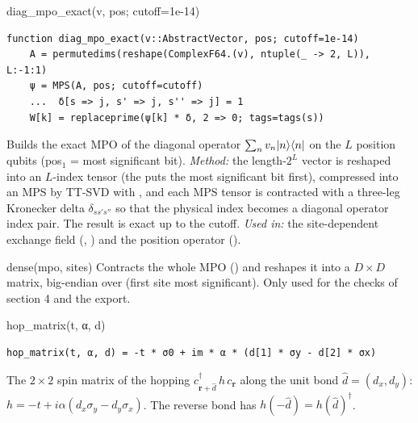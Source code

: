 \begin{function}{diag\_mpo\_exact(v, pos; cutoff=1e-14)}
\begin{Verbatim}
function diag_mpo_exact(v::AbstractVector, pos; cutoff=1e-14)
    A = permutedims(reshape(ComplexF64.(v), ntuple(_ -> 2, L)), L:-1:1)
    ψ = MPS(A, pos; cutoff=cutoff)
    ...  δ[s => j, s' => j, s'' => j] = 1
    W[k] = replaceprime(ψ[k] * δ, 2 => 0; tags=tags(s))
\end{Verbatim}
Builds the exact MPO of the diagonal operator $\sum_n v_n|n\rangle\langle n|$ on the $L$ position qubits (pos$_1$ = most significant bit).
\emph{Method:} the length-$2^L$ vector is reshaped into an $L$-index tensor (the  puts the most significant bit first),
compressed into an MPS by TT-SVD with , and each MPS tensor is contracted with a three-leg Kronecker delta
$\delta_{s s' s''}$ so that the physical index becomes a diagonal operator index pair. The result is exact up to the cutoff.
\emph{Used in:} the site-dependent exchange field (, ) and the position operator
().
\end{function}

\begin{function}{dense(mpo, sites)}
Contracts the whole MPO () and reshapes it into a $D\times D$ matrix, big-endian over  (first site most
significant). Only used for the checks of section 4 and the  export.
\end{function}

\begin{function}{hop\_matrix(t, α, d)}
\begin{Verbatim}
hop_matrix(t, α, d) = -t * σ0 + im * α * (d[1] * σy - d[2] * σx)
\end{Verbatim}
The $2\times2$ spin matrix of the hopping $c^\dagger_{\mathbf r+\hat d}\,h\,c_{\mathbf r}$ along the unit bond $\hat d = (d_x, d_y)$:
$h = -t + i\alpha(d_x\sigma_y - d_y\sigma_x)$. The reverse bond has $h(-\hat d) = h(\hat d)^\dagger$.
\end{function}


